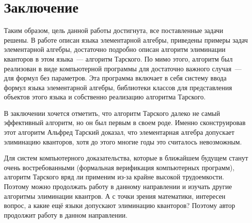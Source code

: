 \section*{Заключение}

	Таким образом, цель данной работы достигнута, все поставленные задачи решены. В работе описан языка элементарной алгебры, приведены примеры задач элементарной алгебры, достаточно подробно описан алгоритм элиминации кванторов в этом языка~--- алгоритм Тарского. По мимо этого, алгоритм был реализован в виде компьютерной программы для достаточно важного случая~--- для формул без параметров. Эта программа включает в себя систему ввода формул языка элементарной алгебры, библиотеки классов для представления объектов этого языка и собственно реализацию алгоритма Тарского.

	В заключении хочется отметить, что алгоритм Тарского далеко не самый эффективный алгоритм, но он был первым в своем роде. Именно сконструировав этот алгоритм Альфред Тарский доказал, что элементарная алгебра допускает элиминацию кванторов, хотя до этого многие годы это считалось невозможным. 
	
	Для систем компьютерного доказательства, которые в ближайшем будущем станут очень востребованными (формальная верификация компьютерных программ), алгоритм Тарского вряд ли применим из-за крайне высокой трудоемкости. Поэтому можно продолжать работу в данному направлении и изучать другие алгоритмы элиминации квантров. А с точки зрения математики, интересен вопрос, а какие ещё языки допускают элиминацию кванторов? Поэтому автор продолжит работу в данном направлении.